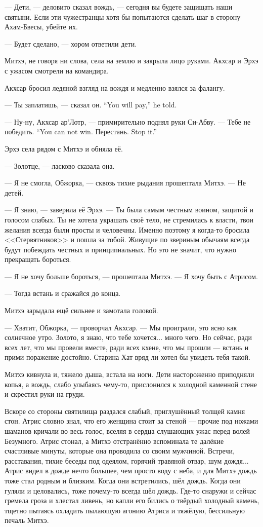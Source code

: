 --- Дети, --- деловито сказал вождь, --- сегодня вы будете защищать наши святыни.
Если эти чужестранцы хотя бы попытаются сделать шаг в сторону Ахам-Бвесы, убейте их.

--- Будет сделано, --- хором ответили дети.

Митхэ, не говоря ни слова, села на землю и закрыла лицо руками.
Акхсар и Эрхэ с ужасом смотрели на командира.

Акхсар бросил ледяной взгляд на вождя и медленно взялся за фалангу.

{--- Ты заплатишь, --- сказал он.}
{``You will pay,'' he told.}

--- Ну-ну, Акхсар ар’Лотр, --- примирительно поднял руки Си-Абву.
{--- Тебе не победить.}
{``You can not win.}
{Перестань.}
{Stop it.''}

Эрхэ села рядом с Митхэ и обняла её.

--- Золотце, --- ласково сказала она.

--- Я не смогла, Обжорка, --- сквозь тихие рыдания прошептала Митхэ.
--- Не детей.

--- Я знаю, --- заверила её Эрхэ.
--- Ты была самым честным воином, защитой и голосом слабых.
Ты не хотела украшать своё тело, не стремилась к власти, твои желания всегда были просты и человечны.
Именно поэтому я когда-то бросила <<Стервятников>> и пошла за тобой.
Живущие по звериным обычаям всегда будут побеждать честных и принципиальных.
Но это не значит, что нужно прекращать бороться.

--- Я не хочу больше бороться, --- прошептала Митхэ.
--- Я хочу быть с Атрисом.

--- Тогда встань и сражайся до конца.

Митхэ зарыдала ещё сильнее и замотала головой.

--- Хватит, Обжорка, --- проворчал Акхсар.
--- Мы проиграли, это ясно как солнечное утро.
Золото, я знаю, что тебе хочется... много чего.
Но сейчас, ради всех лет, что мы провели вместе, ради всех кхене, что мы прошли --- встань и прими поражение достойно.
Старина Хат вряд ли хотел бы увидеть тебя такой.

Митхэ кивнула и, тяжело дыша, встала на ноги.
Дети настороженно приподняли копья, а вождь, слабо улыбаясь чему-то, прислонился к холодной каменной стене и скрестил руки на груди.

Вскоре со стороны святилища раздался слабый, приглушённый толщей камня стон.
Атрис словно знал, что его женщина стоит за стеной --- прочие под ножами шаманов кричали во весь голос, вселяя в сердца слушающих ужас перед волей Безумного.
Атрис стонал, а Митхэ отстранённо вспоминала те далёкие счастливые минуты, которые она проводила со своим мужчиной.
Встречи, расставания, тихие беседы под одеялом, горячий травяной отвар, шум дождя...
Атрис видел в дожде нечто большее, чем просто воду с неба, и для Митхэ дождь тоже стал родным и близким.
Когда они встретились, шёл дождь.
Когда они гуляли и целовались, тоже почему-то всегда шёл дождь.
Где-то снаружи и сейчас гремела гроза и хлестал ливень, но капли его бились о твёрдый холодный камень, тщетно пытаясь охладить пылающую агонию Атриса и тяжёлую, бессильную печаль Митхэ.

